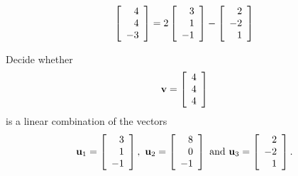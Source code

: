 \begin{enumialphparenastyle}
\begin{ex}
\begin{sol}
\begin{equation*}
\left[
\begin{array}{r}
4 \\
4 \\
-3
\end{array}
\right]
=
2
\left[
\begin{array}{r}
3 \\
1 \\
-1
\end{array}
\right]
-
\left[
\begin{array}{r}
2 \\
-2\\
1
\end{array}
\right]
\end{equation*}
\end{sol}
\end{ex}


\begin{ex}
Decide whether 
\begin{equation*}
{\bf v}= \left[
\begin{array}{r}
4 \\
4 \\
4
\end{array}
\right]
\end{equation*}
is a linear combination of the vectors 
\begin{equation*}
\vect{u}_1 = \leftB
\begin{array}{r}
3 \\
1 \\
-1
\end{array}
\rightB , \ 
\vect{u}_2 = 
\leftB
\begin{array}{r}
8 \\
0\\
-1
\end{array}
\rightB
\mbox{ and } 
\vect{u}_3 = 
\leftB
\begin{array}{r}
2 \\
-2\\
1
\end{array}
\rightB.
\end{equation*}


\end{ex}
\end{enumialphparenastyle}
